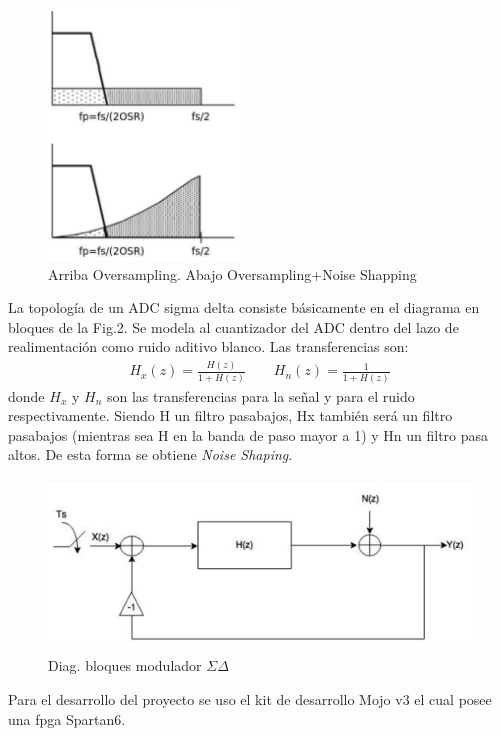 \documentclass[a4paper,conference]{IEEEtran}
\begin{document}
\begin{figure}[!b]
\centering
\includegraphics[width=2in]{Noise_Shaping.eps}
\caption{Arriba Oversampling. Abajo Oversampling+Noise Shapping}
\label{fig_1}
\end{figure}
La topolog\'ia de un ADC sigma delta consiste b\'asicamente en el diagrama en bloques de la Fig.2. Se modela al cuantizador del ADC dentro del lazo de realimentaci\'on como ruido aditivo blanco. Las transferencias son:
\begin{align}
H_x(z)=\frac{H(z)}{1+H(z)} \qquad
H_n(z)=\frac{1}{1+H(z)}
\end{align}
donde $H_x$ y $H_n$ son las transferencias para la señal y para el ruido respectivamente. Siendo H un filtro pasabajos, Hx también será un filtro pasabajos (mientras sea H en la banda de paso mayor a 1) y Hn un filtro pasa altos. De esta forma se obtiene \textit{Noise Shaping}.
\begin{figure}[!t]
\centering
\includegraphics[height=1.8in]{Sigma-Delta_Tiempo_Discreto.eps}
\caption{Diag. bloques modulador $\Sigma\Delta$}
\label{fig_2}
\end{figure}

Para el desarrollo del proyecto se uso el kit de desarrollo Mojo v3 el cual posee una fpga Spartan6.
\end{document}
